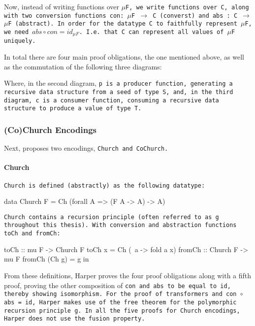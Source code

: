 Now, instead of writing functions over \tt{$\mu$F}, we write functions over \tt{C}, along with two conversion functions \tt{con: $\mu$F $\to$ C} (converst) and \tt{abs : C $\to$ $\mu$F} (abstract).
In order for the datatype \tt{C} to faithfully represent \tt{$\mu$F}, we need $abs \circ con = id_{\mu F}$. I.e. that \tt{C} can represent all values of \tt{$\mu$F} uniquely.

In total there are four main proof obligations, the one mentioned above, as well as the commutation of the following three diagrams:
\begin{figure}[H]\hfill
{}\hfill\null
{}\hfill\null
{}\hfill\null
\end{figure}
Where, in the second diagram, \tt{p} is a producer function, generating a recursive data structure from a seed of type \tt{S}, and, in the third diagram, \tt{c} is a consumer function, consuming a recursive data structure to produce a value of type \tt{T}.

\subsubsection{(Co)Church Encodings}
Next, \cite{Harper2011} proposes two encodings, \tt{Church} and \tt{CoChurch}.

\paragraph{Church} \tt{Church} is defined (abstractly) as the following datatype:
\begin{code}
data Church F = Ch (forall A => (F A -> A) -> A)
\end{code}
\tt{Church} contains a recursion principle (often referred to as \tt{g} throughout this thesis).
With conversion and abstraction functions \tt{toCh} and \tt{fromCh}:
\begin{code}
toCh :: mu F -> Church F
toCh x = Ch (\ a -> fold a x)
fromCh :: Church F -> mu F
fromCh (Ch g) = g in
\end{code}
From these definitions, Harper proves the four proof obligations along with a fifth proof, proving the other composition of \tt{con} and \tt{abs} to be equal to \tt{id}, thereby showing isomorphism.
For the proof of transformers and \tt{con $\circ$ abs = id}, Harper makes use of the free theorem for the polymorphic recursion principle \tt{g}.
In all the five proofs for Church encodings, Harper does not use the fusion property.

